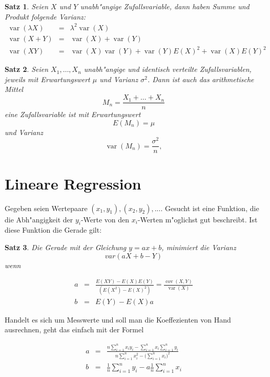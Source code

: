 \documentclass[ngerman, a4paper, 10pt, twocolumn, DIV20, headings=small]{scrartcl}
\newtheorem{satz}{Satz}
\begin{document}
\begin{satz}
\label{rechenregeln-varianz}
Seien $X$ und $Y$ unabh"angige Zufallsvariable, dann haben
Summe und Produkt folgende Varianz:
\begin{eqnarray*}
\operatorname{var}(\lambda X)&=&\lambda^2\operatorname{var}(X)\\
\operatorname{var}(X+Y)&=&\operatorname{var}(X)+\operatorname{var}(Y)\\
\operatorname{var}(XY)&=&\operatorname{var}(X)\operatorname{var}(Y)
+
\operatorname{var}(Y)E(X)^2+\operatorname{var}(X)E(Y)^2
\end{eqnarray*}
\end{satz}

\begin{satz}
  
Seien $X_1,\dots,X_n$ unabh"angige und identisch verteilte Zufallsvariablen, jeweils mit Erwartungswert $\mu$ und Varianz $\sigma^2$. Dann ist auch das arithmetische Mittel
\[
M_n=\frac{X_1+\dots+X_n}{n}
\]
eine Zufallsvariable ist mit Erwartungswert
\[
E(M_n)=\mu
\]
und Varianz
\[
\operatorname{var}(M_n) =\frac{\sigma^2}n,
\]
\end{satz}

\section{Lineare Regression}
\label{sec:lineareregression}

Gegeben seien Wertepaare $(x_1, y_1), (x_2, y_2), ...$. Gesucht ist eine Funktion, die die Abh"angigkeit der $y_i$-Werte von den $x_i$-Werten m"oglichst gut beschreibt. Ist diese Funktion die Gerade gilt:
\begin{satz}
  Die Gerade mit der Gleichung $y = ax + b$, minimiert die Varianz
\[
var(aX + b - Y)
\]
wenn

\begin{eqnarray*}
a&=&\frac{E(XY)-E(X)E(Y)}{(E(X^2)-E(X)^2)}=\frac{\operatorname{cov}(X,Y)}{\operatorname{var}(X)}\\
b&=&E(Y)-E(X)a
\end{eqnarray*}

\end{satz}

Handelt es sich um Messwerte und soll man die Koeffezienten von Hand ausrechnen, geht das einfach mit der Formel

\begin{eqnarray*}
a&=&\frac{\displaystyle n\sum_{i=1}^nx_iy_i-\sum_{i=1}^nx_i\sum_{i=1}^ny_i}{\displaystyle n\sum_{i=1}^nx_i^2-\biggl(\sum_{i=1}^nx_i\biggr)^2}\\
b&=&\frac1n\sum_{i=1}^ny_i-a\frac1n\sum_{i=1}^nx_i\\
\end{eqnarray*}
\end{document}
